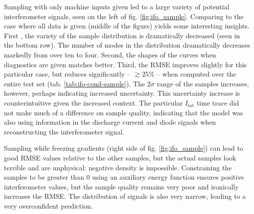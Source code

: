 Sampling with only machine inputs given led to a large variety of potential interferometer signals, seen on the left of fig. \ref{fig:ifo_sample}. Comparing to the case where all data is given (middle of the figure) yields some interesting insights. First , the variety of the sample distribution is dramatically decreased (seen in the bottom row). The number of modes in the distribution dramatically decreases markedly from over ten to four. Second, the shapes of the curves when diagnostics are given matches better. Third, the RMSE improves slightly for this particular case, but reduces significantly -- $\gtrsim 25$\% -- when computed over the entire test set (tab. \ref{tab:ifo-cond-sample}). The $2 \sigma$ range of the samples increases, however, perhaps indicating increased uncertainty. This uncertainty increase is counterintuitive given the increased context. The particular $I_\text{sat}$ time trace did not make much of a difference on sample quality, indicating that the model was also using information in the discharge current and diode signals when reconstructing the interferometer signal.

Sampling while freezing gradients (right side of fig. \ref{fig:ifo_sample}) can lead to good RMSE values relative to the other samples, but the actual samples look terrible and are unphysical: negative density is impossible. Constraining the samples to be greater than 0 using an auxiliary energy function ensures positive interferometer values, but the sample quality remains very poor and ironically increases the RMSE. The distribution of signals is also very narrow, leading to a very overconfident prediction. 

